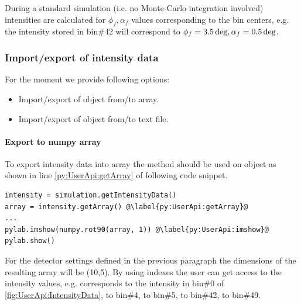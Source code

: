 During a standard simulation (i.e. no Monte-Carlo integration involved) intensities are calculated for $\phi_f, \alpha_f$ values corresponding to the bin centers, e.g. the intensity stored in bin\#42 will correspond to $\phi_f=3.5\,{\rm deg}, \alpha_f=0.5\,{\rm deg}$.
\vspace*{2mm}




\subsubsection{Import/export of intensity data}
For the moment we provide following options:
\begin{itemize}
\item Import/export of  object from/to  array.
\item Import/export of  object from/to text file.

\end{itemize}

\paragraph{Export to numpy array}

To export intensity data into   array the method  should be used
on  object as shown in line \ref{py:UserApi:getArray} of
following code snippet.

\begin{lstlisting}
intensity = simulation.getIntensityData()
array = intensity.getArray() @\label{py:UserApi:getArray}@
...
pylab.imshow(numpy.rot90(array, 1)) @\label{py:UserApi:imshow}@
pylab.show()
\end{lstlisting}

For the detector settings defined in the previous paragraph the dimensions of the resulting array will be (10,5). By using  indexes the user can get access to the intensity values, e.g.
 corresponds to the intensity in bin\#0 of \cref{fig:UserApi:IntensityData},
 to bin\#4,
 to bin\#5,
 to bin\#42,
 to bin\#49.



